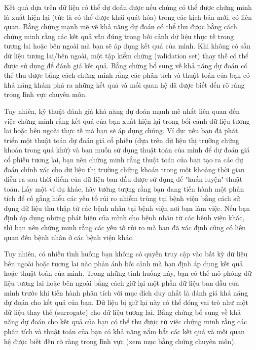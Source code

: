 \begin{tcolorbox}[title={Hộp 1.3: Khả năng dự đoán}]
Kết quả dựa trên dữ liệu có thể dự đoán được nếu chúng có thể được chứng minh là xuất hiện lại (tức là có thể được khái quát hóa) trong các kịch bản mới, có liên quan. Bằng chứng mạnh mẽ về khả năng dự đoán có thể thu được bằng cách chứng minh rằng các kết quả vẫn đúng trong bối cảnh dữ liệu thực tế trong tương lai hoặc bên ngoài mà bạn sẽ áp dụng kết quả của mình. Khi không có sẵn dữ liệu tương lai/bên ngoài, một tập kiểm chứng (validation set) thay thế có thể được sử dụng để đánh giá kết quả. Bằng chứng bổ sung về khả năng dự đoán có thể thu được bằng cách chứng minh rằng các phân tích và thuật toán của bạn có khả năng khám phá ra những kết quả và mối quan hệ đã được biết đến rõ ràng trong lĩnh vực chuyên môn.
\end{tcolorbox}

Tuy nhiên, kỹ thuật đánh giá khả năng dự đoán mạnh mẽ nhất liên quan đến việc chứng minh rằng kết quả của bạn xuất hiện lại trong bối cảnh dữ liệu tương lai hoặc bên ngoài thực tế mà bạn sẽ áp dụng chúng. Ví dụ: nếu bạn đã phát triển một thuật toán dự đoán giá cổ phiếu (dựa trên dữ liệu thị trường chứng khoán trong quá khứ) và bạn muốn sử dụng thuật toán của mình để dự đoán giá cổ phiếu tương lai, bạn nên chứng minh rằng thuật toán của bạn tạo ra các dự đoán chính xác cho dữ liệu thị trường chứng khoán trong một khoảng thời gian diễn ra sau thời điểm của dữ liệu ban đầu được sử dụng để "huấn luyện" thuật toán. Lấy một ví dụ khác, hãy tưởng tượng rằng bạn đang tiến hành một phân tích để cố gắng hiểu các yếu tố rủi ro nhiễm trùng tại bệnh viện bằng cách sử dụng dữ liệu thu thập từ các bệnh nhân tại bệnh viện nơi bạn làm việc. Nếu bạn định áp dụng những phát hiện của mình cho bệnh nhân từ các bệnh viện khác, thì bạn nên chứng minh rằng các yếu tố rủi ro mà bạn đã xác định cũng có liên quan đến bệnh nhân ở các bệnh viện khác.

Tuy nhiên, có nhiều tình huống bạn không có quyền truy cập vào bất kỳ dữ liệu bên ngoài hoặc tương lai nào phản ánh bối cảnh mà bạn định áp dụng kết quả hoặc thuật toán của mình. Trong những tình huống này, bạn có thể mô phỏng dữ liệu tương lai hoặc bên ngoài bằng cách giữ lại một phần dữ liệu ban đầu của mình trước khi tiến hành phân tích với mục đích duy nhất là đánh giá khả năng dự đoán cho kết quả của bạn. Dữ liệu bị giữ lại này có thể đóng vai trò như một dữ liệu thay thế (surrogate) cho dữ liệu tương lai. Bằng chứng bổ sung về khả năng dự đoán cho kết quả của bạn có thể thu được từ việc chứng minh rằng các phân tích và thuật toán của bạn có khả năng nắm bắt các kết quả và mối quan hệ được biết đến rõ ràng trong lĩnh vực (xem mục bằng chứng chuyên môn).

